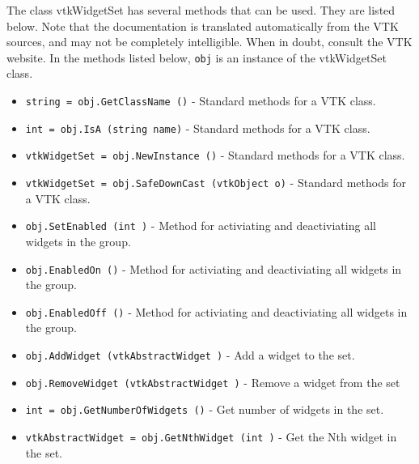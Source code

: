 The class vtkWidgetSet has several methods that can be used.
  They are listed below.
Note that the documentation is translated automatically from the VTK sources,
and may not be completely intelligible.  When in doubt, consult the VTK website.
In the methods listed below, \verb|obj| is an instance of the vtkWidgetSet class.
\begin{itemize}
\item  \verb|string = obj.GetClassName ()| -  Standard methods for a VTK class.

\item  \verb|int = obj.IsA (string name)| -  Standard methods for a VTK class.

\item  \verb|vtkWidgetSet = obj.NewInstance ()| -  Standard methods for a VTK class.

\item  \verb|vtkWidgetSet = obj.SafeDownCast (vtkObject o)| -  Standard methods for a VTK class.

\item  \verb|obj.SetEnabled (int )| -  Method for activiating and deactiviating all widgets in the group.

\item  \verb|obj.EnabledOn ()| -  Method for activiating and deactiviating all widgets in the group.

\item  \verb|obj.EnabledOff ()| -  Method for activiating and deactiviating all widgets in the group.

\item  \verb|obj.AddWidget (vtkAbstractWidget )| -  Add a widget to the set.

\item  \verb|obj.RemoveWidget (vtkAbstractWidget )| -  Remove a widget from the set

\item  \verb|int = obj.GetNumberOfWidgets ()| -  Get number of widgets in the set.

\item  \verb|vtkAbstractWidget = obj.GetNthWidget (int )| -  Get the Nth widget in the set.

\end{itemize}
